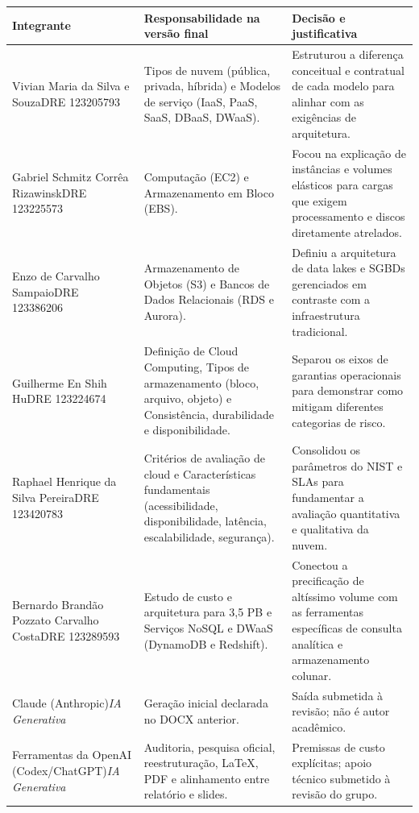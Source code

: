 \documentclass[11pt,a4paper]{article}
\begin{document}
\begin{longtable}{@{}p{5cm}p{5cm}p{5.4cm}@{}}\toprule
\textbf{Integrante} & \textbf{Responsabilidade na versão final} & \textbf{Decisão e justificativa}\\\midrule\endhead
Vivian Maria da Silva e Souza\newline DRE 123205793 & Tipos de nuvem (pública, privada, híbrida) e Modelos de serviço (IaaS, PaaS, SaaS, DBaaS, DWaaS). & Estruturou a diferença conceitual e contratual de cada modelo para alinhar com as exigências de arquitetura.\\
Gabriel Schmitz Corrêa Rizawinsk\newline DRE 123225573 & Computação (EC2) e Armazenamento em Bloco (EBS). & Focou na explicação de instâncias e volumes elásticos para cargas que exigem processamento e discos diretamente atrelados.\\
Enzo de Carvalho Sampaio\newline DRE 123386206 & Armazenamento de Objetos (S3) e Bancos de Dados Relacionais (RDS e Aurora). & Definiu a arquitetura de data lakes e SGBDs gerenciados em contraste com a infraestrutura tradicional.\\
Guilherme En Shih Hu\newline DRE 123224674 & Definição de Cloud Computing, Tipos de armazenamento (bloco, arquivo, objeto) e Consistência, durabilidade e disponibilidade. & Separou os eixos de garantias operacionais para demonstrar como mitigam diferentes categorias de risco.\\
Raphael Henrique da Silva Pereira\newline DRE 123420783 & Critérios de avaliação de cloud e Características fundamentais (acessibilidade, disponibilidade, latência, escalabilidade, segurança). & Consolidou os parâmetros do NIST e SLAs para fundamentar a avaliação quantitativa e qualitativa da nuvem.\\
Bernardo Brandão Pozzato Carvalho Costa\newline DRE 123289593 & Estudo de custo e arquitetura para 3,5 PB e Serviços NoSQL e DWaaS (DynamoDB e Redshift). & Conectou a precificação de altíssimo volume com as ferramentas específicas de consulta analítica e armazenamento colunar.\\
Claude (Anthropic)\newline \textit{IA Generativa} & Geração inicial declarada no DOCX anterior. & Saída submetida à revisão; não é autor acadêmico.\\
Ferramentas da OpenAI (Codex/ChatGPT)\newline \textit{IA Generativa} & Auditoria, pesquisa oficial, reestruturação, LaTeX, PDF e alinhamento entre relatório e slides. & Premissas de custo explícitas; apoio técnico submetido à revisão do grupo.\\\bottomrule
\end{longtable}
\end{document}
